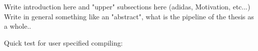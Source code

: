 
Write introduction here and "upper" subsections here (adidas, Motivation, etc...)\\

Write in general something like an "abstract", what is the pipeline of the thesis as a whole..

Quick test for user specified compiling:\\
\cite{lutkepohl1996specification}
